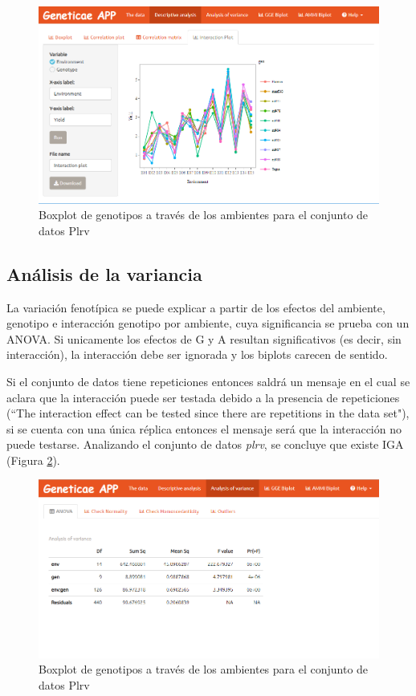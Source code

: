 \begin{figure}[H]
	\begin{center}
		\includegraphics[width=17cm]{./Graficos/int_plot.png}
	\end{center}
	\caption{Boxplot de genotipos a través de los ambientes para el conjunto de datos Plrv}
	\label{fig:fig49}
\end{figure}



\subsection{Análisis de la variancia}

La variación fenotípica se puede explicar a partir de los efectos del ambiente, genotipo e interacción genotipo por ambiente, cuya significancia se prueba con un ANOVA. Si unicamente los efectos de G y A resultan significativos (es decir, sin interacción), la interacción debe ser ignorada y los biplots carecen de sentido.

Si el conjunto de datos tiene repeticiones entonces saldrá un mensaje en el cual se aclara que la interacción puede ser testada debido a la presencia de repeticiones (``The interaction effect can be tested since there are repetitions in the data set"), si se cuenta con una única réplica entonces el mensaje será que la interacción no puede testarse. Analizando el conjunto de datos \emph{plrv}, se concluye que existe IGA (Figura \ref{fig:fig49}). 

\begin{figure}[H]
	\begin{center}
		\includegraphics[width=17cm]{./Graficos/ANOVA.png}
	\end{center}
	\caption{Boxplot de genotipos a través de los ambientes para el conjunto de datos Plrv}
	\label{fig:fig49}
\end{figure}


